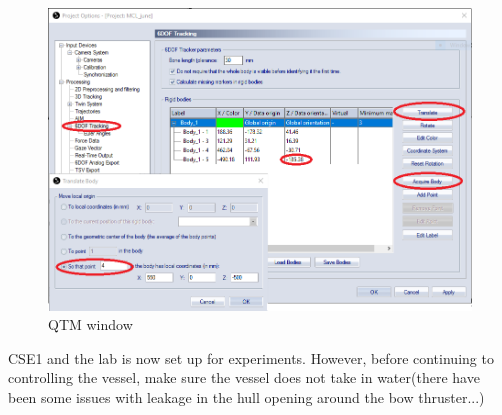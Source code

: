 \begin{figure}[htb!]
	\centering
	\includegraphics[scale=0.5]{fig/QTM_window.png}
	\caption{QTM window}
	\label{fig:QTM_window}
\end{figure}
CSE1 and the lab is now set up for experiments. However, before continuing to controlling the vessel, make sure the vessel does not take in water(there have been some issues with leakage in the hull opening around the bow thruster...)
